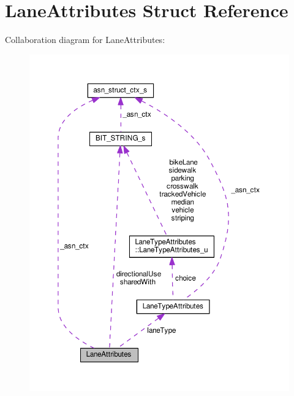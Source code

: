 \hypertarget{structLaneAttributes}{}\section{Lane\+Attributes Struct Reference}
\label{structLaneAttributes}


Collaboration diagram for Lane\+Attributes\+:\nopagebreak
\begin{figure}[H]
\begin{center}
\leavevmode
\includegraphics[width=350pt]{structLaneAttributes__coll__graph}
\end{center}
\end{figure}
